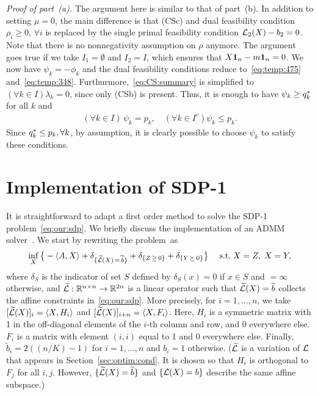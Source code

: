 \bigskip
\emph{Proof of part~(a).} The argument here is similar to that of part~(b). In addition to setting $\mu = 0$, the main difference is that (CSc) and dual feasibility condition $\rho_i \ge 0, \, \forall i$ is replaced by the single primal feasibility condition $\mathcal{L}_2(X) - b_2 = 0$. Note that there is no nonnegativity assumption on $\rho$ anymore. The argument goes true if we take $I_1 = \emptyset$ and $I_2 = I$, which ensures that $X \bm{1}_n - m \bm{1}_n = 0$. We now have $\psi_k = - \phi_k$ and the dual feasibility conditions reduce to~\eqref{eq:temp:475} and~\eqref{eq:temp:348}. Furthurmore,~\eqref{eq:CS:summary} is simplified to $(\forall k \in I) \lambda_k = 0$, since only (CSb) is present.  Thus, it is enough to have $\psi_k \ge q^*_k$ for all $k$ and 
\begin{align}
  (\forall k \in I)\, \psi_k = p_k, \quad (\forall k \in I^c) \psi_k \le p_k.
\end{align}
Since $q^*_k \le p_k, \forall k$, by assumption, it is clearly possible to choose $\psi_k$ to satisfy these conditions. 





\newcommand{\Lct}{\widetilde{\Lc}}
\newcommand{\bt}{\widetilde{b}}
\newcommand{\mut}{\widetilde{\mu}}
\section{Implementation of SDP-1}\label{sec:implement}
It is straightforward to adapt a first order method to solve the SDP-1
problem~\eqref{eq:our:sdp}. %
We briefly discuss the implementation of an ADMM solver~\cite{Boyd2010}. We start by rewriting the problem~as 
\begin{align*}
    \inf_X \big\{ -\ip{A,X} +\delta_{\{\Lct(X) \,= \,\bt\}}
      + \delta_{\{Z \,\ge\, 0\}} 
      + \delta_{\{Y \,\succeq\, 0\}} \big\} \; \quad \text{s.t.} \; X = Z, \;   X = Y,
\end{align*}
where $\delta_S$ is the indicator of set $S$ defined by $\delta_S(x) = 0$ if $x \in S$ and $= \infty$ otherwise, and $\Lct: \reals^{n \times n} \to \reals^{2 n}$ is a linear
operator such that $\Lct(X) = \bt$ collects the affine constraints
in~\eqref{eq:our:sdp}. More precisely, for $i=1,\dots,n$, we  take
$[\Lct(X)]_i = \ip{X,H_i}$ and $[\Lct(X)]_{i+n} = \ip{X,F_i}$. Here,
$H_i$ is a symmetric matrix with 1 in the off-diagonal elements of the
$i$-th column and row, and 0 everywhere else.  $F_i$ is a matrix with
element $(i,i)$ equal to 1 and 0 everywhere else.   Finally, $\bt_i = 2((n/K)-1)$ for $i=1,\dots,n$ and $b_i = 1$ otherwise. ($\Lct$ is a variation of $\mathcal{L}$ that appears in Section~\ref{sec:optim:cond}. It is chosen so that $H_i$ is orthogonal to $F_j$ for all $i,j$. However, $\{\Lct(X) =\bt\}$ and $\{\mathcal{L}(X) = b\}$ describe the same affine subspace.)


